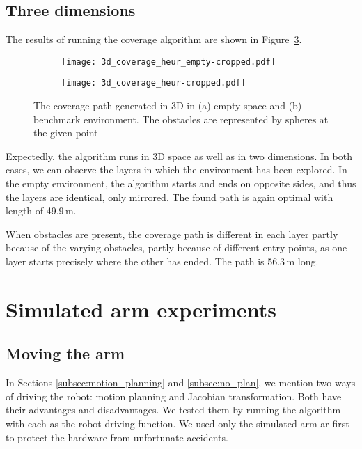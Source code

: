 \documentclass[buriama8_dp.tex]{subfiles}
\begin{document}
\subsection{Three dimensions}
\label{subsec:3d_sim}

The results of running the coverage algorithm are shown in Figure~\ref{fig:heur_3d_coverage}.

\begin{figure}[ht]
  \centering
  \begin{subfigure}[t]{0.48\textwidth}
    \texttt{[image: 3d\_coverage\_heur\_empty-cropped.pdf]}
    \caption{}
    \label{fig:heur_3d_empty}
  \end{subfigure}
  \;
  \begin{subfigure}[t]{0.48\textwidth}
    \texttt{[image: 3d\_coverage\_heur-cropped.pdf]}
    \caption{}
    \label{fig:heur_3d_env}
  \end{subfigure}
  
  \caption[Coverage path -- compact space heuristic in 3D]{The coverage path generated in 3D in (a) empty space and (b) benchmark environment. The obstacles are represented by spheres at the given point}
  \label{fig:heur_3d_coverage}
\end{figure}

Expectedly, the algorithm runs in 3D space as well as in two dimensions. In both cases, we can observe the layers in which the environment has been explored. In the empty environment, the algorithm starts and ends on opposite sides, and thus the layers are identical, only mirrored. The found path is again optimal with length of 49.9\,m.

When obstacles are present, the coverage path is different in each layer partly because of the varying obstacles, partly because of different entry points, as one layer starts precisely where the other has ended. The path is 56.3\,m long.


\section{Simulated arm experiments}
\label{sec:exp_sim_arm}

\subsection{Moving the arm}
\label{subsec:exp_move}

In Sections \ref{subsec:motion_planning} and \ref{subsec:no_plan}, we mention two ways of driving the robot: motion planning and Jacobian transformation. Both have their advantages and disadvantages. We tested them by running the algorithm with each as the robot driving function. We used only the simulated arm ar first to protect the hardware from unfortunate accidents.
\end{document}
